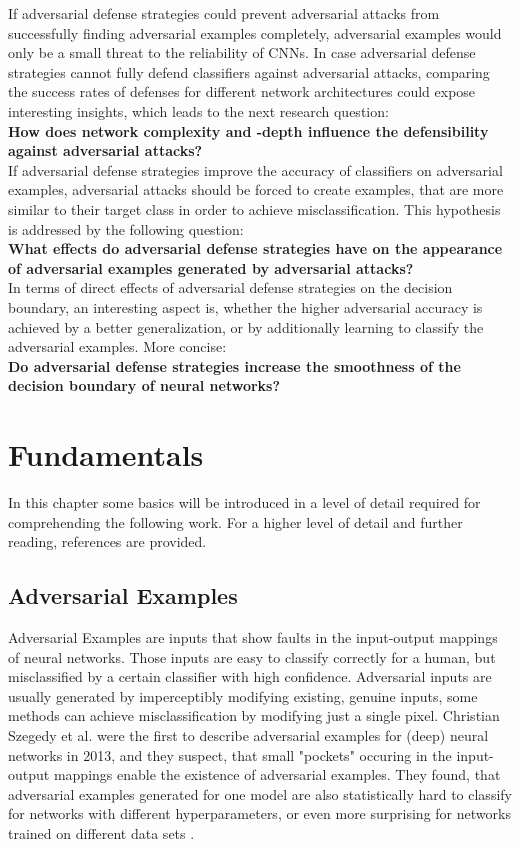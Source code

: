 \documentclass[draft,final]{vutinfth} %
\begin{document}
If adversarial defense strategies could prevent adversarial attacks from successfully finding adversarial examples completely, adversarial examples would only be a small threat to the reliability of CNNs.
In case adversarial defense strategies cannot fully defend classifiers against adversarial attacks, comparing the success rates of defenses for different network architectures could expose
interesting insights, which leads to the next research question: \\
\textbf{How does network complexity and -depth influence the defensibility against adversarial attacks?} \\
If adversarial defense strategies improve the accuracy of classifiers on adversarial examples, adversarial attacks should be forced to create examples, that are more similar to their target
class in order to achieve misclassification.
This hypothesis is addressed by the following question: \\
\textbf{What effects do adversarial defense strategies have on the appearance of adversarial examples generated by adversarial attacks?} \\
In terms of direct effects of adversarial defense strategies on the decision boundary, an interesting aspect is, whether the higher adversarial accuracy is achieved by a better generalization, or by additionally learning to classify the adversarial examples.
More concise:\\
\textbf{Do adversarial defense strategies increase the smoothness of the decision boundary of neural networks?}

\chapter{Fundamentals}

In this chapter some basics will be introduced in a level of detail required for comprehending the following work.
For a higher level of detail and further reading, references are provided.

\section{Adversarial Examples}

Adversarial Examples are inputs that show faults in the input-output mappings of neural networks.
Those inputs are easy to classify correctly for a human, but misclassified by a certain classifier with high confidence.
Adversarial inputs are usually generated by imperceptibly modifying existing, genuine inputs, some methods can achieve misclassification by modifying just a single pixel\cite{Jiawei2017}.
Christian Szegedy et al. were the first to describe adversarial examples for (deep) neural networks in 2013, and they suspect, that small "pockets" occuring in the input-output mappings enable the existence of adversarial examples.
They found, that adversarial examples generated for one model are also statistically hard to classify for networks with different hyperparameters, or even more surprising for networks trained on different data sets \cite{Szegedy2013}.
\end{document}
